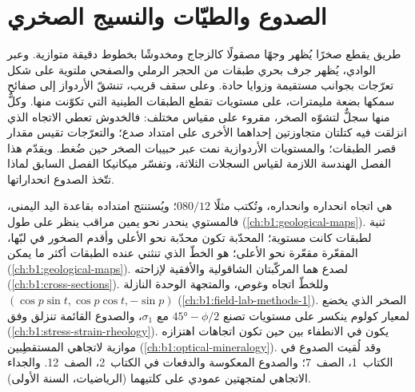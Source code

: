 \chapter{الصدوع والطيّات والنسيج الصخري}\label{ch:b1:faults-folds-fabrics}

طريق يقطع صخرًا يُظهر وجهًا مصقولًا كالزجاج ومخدوشًا بخطوط دقيقة متوازية. وعبر الوادي، يُظهر جرف بحري طبقات من الحجر الرملي والصفحي ملتوية على شكل تعرّجات بجوانب مستقيمة وزوايا حادة. وعلى سقف قريب، تنشقّ الأردواز إلى صفائح سمكها بضعة مليمترات، على مستويات تقطع الطبقات الطينية التي تكوّنت منها. وكلٌّ منها سجلٌّ لتشوّه الصخر، مقروء على مقياس مختلف: فالخدوش تعطي الاتجاه الذي انزلقت فيه كتلتان متجاوزتين إحداهما الأخرى على امتداد صدع؛ والتعرّجات تقيس مقدار قصر الطبقات؛ والمستويات الأردوازية نمت عبر حبيبات الصخر حين ضُغط. ويقدّم هذا الفصل الهندسة اللازمة لقياس السجلات الثلاثة، وتفسّر ميكانيكا الفصل السابق لماذا تتّخذ الصدوع انحداراتها.

\begin{recall}
 هي اتجاه انحداره وانحداره، وتُكتب مثلًا $080/12$؛ ويُستنتج امتداده بقاعدة اليد اليمنى، فالمستوي ينحدر نحو يمين مراقب ينظر على طول  (\cref{ch:b1:geological-maps}). 
 ثنية لطبقات كانت مستوية؛  المحدّبة تكون محدّبة نحو الأعلى وأقدم الصخور في لبّها،  المقعّرة مقعّرة نحو الأعلى؛  هو الخطّ الذي تنثني عنده الطبقات أكثر ما يمكن (\cref{ch:b1:geological-maps}).
  لصدع هما المركّبتان الشاقولية والأفقية لإزاحته (\cref{ch:b1:cross-sections}). وللخطّ اتجاه وغوص، والمتجهة الوحدة النازلة $(\cos p\sin t, \cos p\cos t, -\sin p)$
(\cref{ch:b1:field-lab-methods-1}). الصخر الذي يخضع لمعيار كولوم ينكسر على مستويات تصنع $\ang{45} - \phi/2$ مع $\sigma_1$، والصدوع القائمة تنزلق وفق  (\cref{ch:b1:stress-strain-rheology}).  يكون في الانطفاء بين  حين تكون اتجاهات اهتزازه موازية لاتجاهي المستقطِبين (\cref{ch:b1:optical-mineralogy}). وقد لُقيت الصدوع في الكتاب~1، الصف~7؛ والصدوع المعكوسة والدفعات  في الكتاب~2، الصف~12. والجداء الاتجاهي لمتجهتين عمودي على كلتيهما (الرياضيات، السنة الأولى).
\end{recall}

